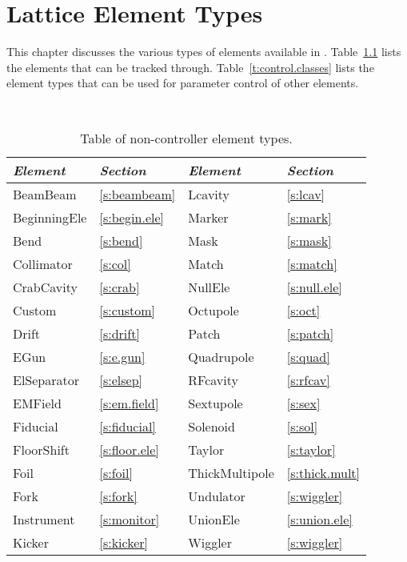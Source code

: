 \chapter{Lattice Element Types}
\label{c:ele.types}


This chapter discusses the various types of elements
available in \bmadjl.
Table~\ref{t:particle.classes} lists the elements that can be tracked through.
Table~\ref{t:control.classes} lists the  element types that can be used for parameter
control of other elements. 

\begin{table}[htb]
\centering
{\tt
\begin{tabular}{llll} \toprule
  {\it Element}    & {\it Section}         & {\it Element}      & {\it Section}       \\ \midrule
  BeamBeam         & \ref{s:beambeam}      &  Lcavity          & \ref{s:lcav}         \\
  BeginningEle     & \ref{s:begin.ele}     &  Marker            & \ref{s:mark}        \\
  Bend             & \ref{s:bend}          &  Mask              & \ref{s:mask}        \\
  Collimator       & \ref{s:col}           &  Match             & \ref{s:match}       \\ 
  CrabCavity       & \ref{s:crab}          &  NullEle           & \ref{s:null.ele}    \\
  Custom           & \ref{s:custom}        &  Octupole          & \ref{s:oct}         \\
  Drift            & \ref{s:drift}         &  Patch             & \ref{s:patch}       \\  
  EGun             & \ref{s:e.gun}         &  Quadrupole        & \ref{s:quad}        \\ 
  ElSeparator      & \ref{s:elsep}         &  RFcavity          & \ref{s:rfcav}       \\ 
  EMField          & \ref{s:em.field}      &  Sextupole         & \ref{s:sex}         \\ 
  Fiducial         & \ref{s:fiducial}      &  Solenoid          & \ref{s:sol}         \\
  FloorShift       & \ref{s:floor.ele}     &  Taylor            & \ref{s:taylor}      \\
  Foil             & \ref{s:foil}          &  ThickMultipole    & \ref{s:thick.mult}  \\
  Fork             & \ref{s:fork}          &  Undulator         & \ref{s:wiggler}     \\
  Instrument       & \ref{s:monitor}       &  UnionEle          & \ref{s:union.ele}   \\
  Kicker           & \ref{s:kicker}        &  Wiggler           & \ref{s:wiggler}     \\
  \bottomrule
\end{tabular}
} 
\caption{Table of non-controller element types.}
\label{t:particle.classes}
\end{table}

